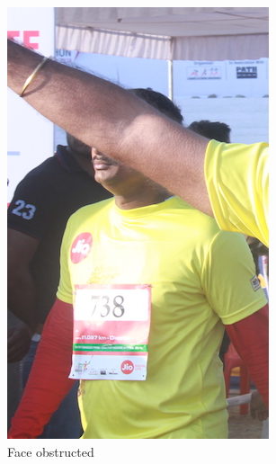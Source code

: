 \begin{figure}[p]
  \centering
  \hspace{\fill}
  \begin{subfigure}[b]{0.25\textwidth}
    \includegraphics[width=\textwidth]{images/dataset/Prominence_FaceNotVisible_Covered}
    \caption{Face obstructed}
  \end{subfigure}
  \hspace{\fill}
  \begin{subfigure}[b]{0.25\textwidth}

\end{subfigure}
\end{figure}
